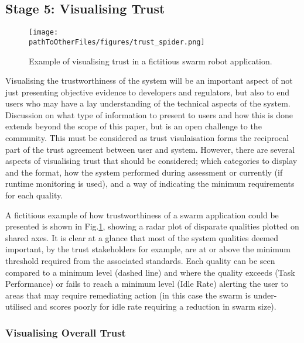 \subsection{Stage 5: Visualising Trust}

\begin{figure}[]
    \centering
    \texttt{[image: \\pathToOtherFiles/figures/trust\_spider.png]}
    \caption{Example of visualising trust in a fictitious swarm robot application.}
    \label{fig:spider}
\end{figure}

Visualising the trustworthiness of the system will be an important aspect of not just presenting objective evidence to developers and regulators, but also to end users who may have a lay understanding of the technical aspects of the system. 
%
Discussion on what type of information to present to users and how this is done extends beyond the scope of this paper, but is an open challenge to the community. This must be considered as trust visulaisation forms the reciprocal part of the trust agreement between user and system. 
%
However, there are several aspects of visualising trust that should be considered; which categories to display and the format, how the system performed during assessment or currently (if runtime monitoring is used), and a way of indicating the minimum requirements for each quality.

A fictitious example of how trustworthiness of a swarm application could be presented is shown in Fig.\ref{fig:spider}, showing a radar plot of disparate qualities plotted on shared axes. It is clear at a glance that most of the system qualities deemed important, by the trust stakeholders for example, are at or above the minimum threshold required from the associated standards.
%
Each quality can be seen compared to a minimum level (dashed line) and where the quality exceeds (Task Performance) or fails to reach a minimum level (Idle Rate) alerting the user to areas that may require remediating action (in this case the swarm is under-utilised and scores poorly for idle rate requiring a reduction in swarm size). 

\subsubsection{Visualising Overall Trust}

